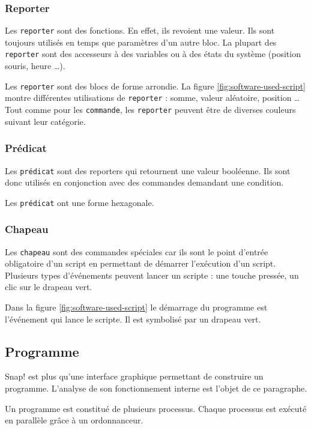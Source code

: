 \subsubsection{Reporter}
Les \texttt{reporter} sont des fonctions. En effet, ils revoient une valeur. Ils sont toujours utilisés en temps que paramètres d'un autre bloc. La plupart des \texttt{reporter} sont des accesseurs à des variables ou à des états du système (position souris, heure \ldots). 

Les \texttt{reporter} sont des blocs de forme arrondie. La figure \ref{fig:software-used-script} montre différentes utilisations de \texttt{reporter} : somme, valeur aléatoire, position \ldots Tout comme pour les \texttt{commande}, les \texttt{reporter} peuvent être de diverses couleurs suivant leur catégorie.

\subsubsection{Prédicat}
Les \texttt{prédicat} sont des reporters qui retournent une valeur booléenne. Ils sont donc utilisés en conjonction avec des commandes demandant une condition.

Les \texttt{prédicat} ont une forme hexagonale.

\subsubsection{Chapeau}
Les \texttt{chapeau} sont des commandes spéciales car ils sont le point d'entrée obligatoire d'un script en permettant de démarrer l'exécution d'un script. Plusieurs types d'événements peuvent lancer un scripte : une touche pressée, un clic sur le drapeau vert.

Dans la figure \ref{fig:software-used-script} le démarrage du programme est l'événement qui lance le scripte. Il est symbolisé par un drapeau vert.

\subsection{Programme}
Snap! est plus qu'une interface graphique permettant de construire un programme. L'analyse de son fonctionnement interne est l'objet de ce paragraphe.

Un programme est constitué de plusieurs processus. Chaque processus est exécuté en parallèle grâce à un ordonnanceur.

